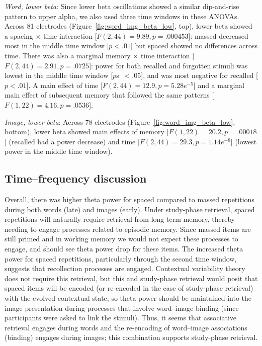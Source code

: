 \textit{Word, lower beta}:  Since lower beta oscillations showed a similar dip-and-rise pattern to upper alpha, we also used three time windows in these ANOVAs.  Across 81 electrodes (Figure~\ref{fig:word_img_beta_low}, top), lower beta showed a spacing $\times$ time interaction [$F(2,44)=9.89, p=.000453$]: massed decreased most in the middle time window [$p<.01$] but spaced showed no differences across time.  There was also a marginal memory $\times$ time interaction [$F(2,44)=2.91, p=.0725$]: power for both recalled and forgotten stimuli was lowest in the middle time window [$p$s~$<.05$], and was most negative for recalled [$p<.01$].
A main effect of time [$F(2,44)=12.9, p=5.28e^{-5}$] and a marginal main effect of subsequent memory that followed the same patterns [$F(1,22)=4.16, p=.0536$].

\textit{Image, lower beta}: Across 78 electrodes (Figure~\ref{fig:word_img_beta_low}, bottom), lower beta showed main effects of memory [$F(1,22)=20.2, p=.00018$] (recalled had a power decrease) and time [$F(2,44)=29.3, p=1.14e^{-8}$] (lowest power in the middle time window).


\subsection{Time--frequency discussion}


Overall, there was higher theta power for spaced compared to massed repetitions during both words (late) and images (early).
Under study-phase retrieval, spaced repetitions will naturally require retrieval from long-term memory, thereby needing to engage processes related to episodic memory.  Since massed items are still primed and in working memory we would not expect these processes to engage, and should see theta power drop for these items.
The increased theta power for spaced repetitions, particularly through the second time window, suggests that recollection processes are engaged.  Contextual variability theory does not require this retrieval, but this and study-phase retrieval would posit that spaced items will be encoded (or re-encoded in the case of study-phase retrieval) with the evolved contextual state, so theta power should be maintained into the image presentation during processes that involve word--image binding (since participants were asked to link the stimuli).
Thus, it seems that associative retrieval engages during words and the re-encoding of word--image associations (binding) engages during images; this combination supports study-phase retrieval.

